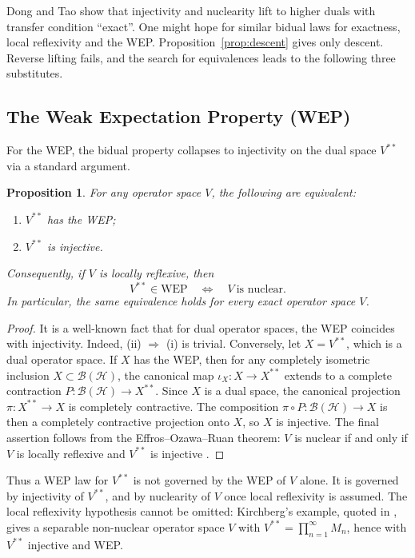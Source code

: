 \documentclass[12pt]{article}
\newtheorem{proposition}[theorem]{Proposition}
\theoremstyle{definition}
\theoremstyle{remark}
\newcommand{\B}{\mathcal{B}}
\newcommand{\Hil}{\mathcal{H}}
\newcommand{\ri}{\rightarrow}
\begin{document}
Dong and Tao \cite{DT} show that injectivity and nuclearity lift to higher
duals with transfer condition ``exact''. One might hope for similar bidual
laws for exactness, local reflexivity and the WEP. Proposition~\ref{prop:descent}
gives only descent. Reverse lifting fails, and the search for equivalences
leads to the following three substitutes.

\subsection{The Weak Expectation Property (WEP)}

For the WEP, the bidual property collapses to injectivity on the dual space
$V^{**}$ via a standard argument.

\begin{proposition}\label{prop:wep-equiv}
For any operator space $V$, the following are equivalent:
\begin{enumerate}
\item[(i)] $V^{**}$ has the WEP;
\item[(ii)] $V^{**}$ is injective.
\end{enumerate}
Consequently, if $V$ is locally reflexive, then
\[
        V^{**}\in\mathrm{WEP}\quad\Longleftrightarrow\quad V\ \text{is nuclear}.
\]
In particular, the same equivalence holds for every exact operator space $V$.
\end{proposition}

\begin{proof}
It is a well-known fact that for dual operator spaces, the WEP coincides with
injectivity. Indeed, (ii) $\Rightarrow$ (i) is trivial. Conversely,
let $X=V^{**}$, which is a dual operator space. If $X$ has the WEP, then for
any completely isometric inclusion $X\subset \B(\Hil)$, the canonical map
$\iota_X: X \ri X^{**}$ extends to a complete contraction $P:\B(\Hil)\ri X^{**}$.
Since $X$ is a dual space, the canonical projection $\pi:X^{**}\ri X$ is
completely contractive. The composition $\pi\circ P:\B(\Hil)\ri X$ is then a
completely contractive projection onto $X$, so $X$ is injective. 
The final assertion follows from the Effros--Ozawa--Ruan theorem:
$V$ is nuclear if and only if $V$ is locally reflexive and $V^{**}$ is
injective \cite[Thm.~4.5]{EOR}.
\end{proof}

Thus a WEP law for $V^{**}$ is not governed by the WEP of $V$ alone. It is
governed by injectivity of $V^{**}$, and by nuclearity of $V$ once local
reflexivity is assumed. The local reflexivity hypothesis cannot be omitted:
Kirchberg's example, quoted in \cite{EOR}, gives a separable non-nuclear
operator space $V$ with $V^{**}=\prod_{n=1}^{\infty}M_n$, hence with
$V^{**}$ injective and WEP.
\end{document}
